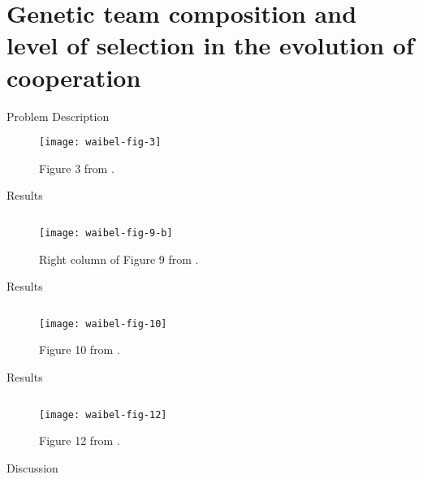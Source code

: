 \section{Genetic team composition and level of selection in the evolution of cooperation \cite{waibel2009genetic}}

\begin{frame}{Problem Description}

\begin{figure}
\texttt{[image: waibel-fig-3]}
\vspace{1ex}
\caption{
Figure 3 from \cite{waibel2009genetic}.
}
\end{figure}

\end{frame}

\begin{frame}{Results}

\begin{figure}
\begin{columns}
\begin{column}{0.7\textwidth}
\texttt{[image: waibel-fig-9-b]}
\end{column}
\begin{column}{0.3\textwidth}
\caption{
Right column of Figure 9 from \cite{waibel2009genetic}.
}
\end{column}
\end{columns}
\end{figure}

\end{frame}

\begin{frame}{Results}


\begin{figure}
\begin{columns}
\begin{column}{0.7\textwidth}
\texttt{[image: waibel-fig-10]}
\end{column}
\begin{column}{0.3\textwidth}
\caption{
Figure 10 from \cite{waibel2009genetic}.
}
\end{column}
\end{columns}
\end{figure}

\end{frame}

\begin{frame}{Results}

\begin{figure}
\begin{columns}
\begin{column}{0.8\textwidth}
\texttt{[image: waibel-fig-12]}
\end{column}
\begin{column}{0.2\textwidth}
\caption{
Figure 12 from \cite{waibel2009genetic}.
}
\end{column}
\end{columns}
\end{figure}

\end{frame}

\begin{frame}{Discussion}

\end{frame}
